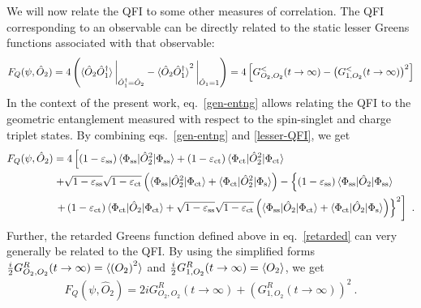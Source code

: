 \documentclass{iopart}
\begin{document}
We will now relate the QFI to some other measures of correlation. The QFI corresponding to an observable can be directly related to the static lesser Greens functions associated with that observable:
\begin{eqnarray}
	\label{lesser-QFI}
	F_Q(\psi,\hat O_2) = 4\left(\braket{\hat O_2 \hat O_1^\dagger}\bigg|_{\hat O_1^\dagger=\hat O_2} - \braket{\hat O_2 \hat O_1^\dagger}^2\bigg|_{\hat O_1=1}\right) = 4\left[G^<_{O_2, O_2}(t\to \infty) - \left(G^<_{1, O_2}(t\to \infty)\right)^2\right]
\end{eqnarray}
In the context of the present work, eq.~\eqref{gen-entng} allows relating the QFI to the geometric entanglement measured with respect to the spin-singlet and charge triplet states. By combining eqs.~\eqref{gen-entng} and \eqref{lesser-QFI}, we get
\begin{eqnarray}
	F_Q(\psi,\hat O_2) &= 4\left[ \left(1 - \varepsilon_\text{ss}\right) \braket{\Phi_\text{ss} | \hat O_2^2 | \Phi_\text{ss}} + \left(1 - \varepsilon_\text{ct}\right) \braket{\Phi_\text{ct} | \hat O_2^2 | \Phi_\text{ct}} \right.\nonumber \\
			   &\left.+ \sqrt{1 - \varepsilon_\text{ss}}\sqrt{1 - \varepsilon_\text{ct}}\left(\braket{\Phi_\text{ss} | \hat O_2^2 | \Phi_\text{ct}} + \braket{\Phi_\text{ct} | \hat O_2^2 | \Phi_\text{s}}\right) - \left\{\left(1 - \varepsilon_\text{ss}\right) \braket{\Phi_\text{ss} | \hat O_2 | \Phi_\text{ss}} \right.\right.\nonumber\\
			   &\left.\left. + \left(1 - \varepsilon_\text{ct}\right) \braket{\Phi_\text{ct} | \hat O_2 | \Phi_\text{ct}} + \sqrt{1 - \varepsilon_\text{ss}}\sqrt{1 - \varepsilon_\text{ct}}\left(\braket{\Phi_\text{ss} | \hat O_2 | \Phi_\text{ct}} + \braket{\Phi_\text{ct} | \hat O_2 | \Phi_\text{s}}\right)\right\}^2 \right]~.
\end{eqnarray}
Further, the retarded Greens function defined above in eq.~\eqref{retarded} can very generally be related to the QFI.
By using the simplified forms \(\frac{i}{2}G^R_{O_2,O_2}(t \to \infty) = \braket{\left(O_2\right)^2}\) and \(\frac{i}{2}G^R_{1,O_2}(t \to \infty) = \braket{O_2}\), we get
\begin{eqnarray}
	F_Q(\psi,\hat O_2) = 2iG^R_{O_2, O_2}(t\to \infty) + \left(G^R_{1, O_2}(t\to \infty)\right)^2~.
\end{eqnarray}
\end{document}
